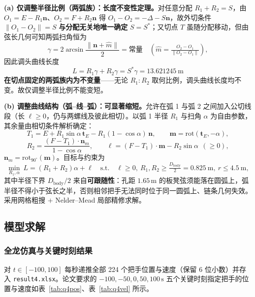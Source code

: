 ﻿\documentclass{cumcmthesis}
\begin{document}
\textbf{(a) 仅调整半径比例（两弧族）：长度不变性定理。}对任意分配 $R_1+R_2=S$，由 $O_1=E-R_1\mathbf{n}$、$O_2=F+R_2\mathbf{n}$ 得 $O_1-O_2=-\Delta-S\mathbf{n}$，故外切条件 $\|O_1-O_2\|=S$ \textbf{与分配无关地唯一确定} $S=S^*$；又切点 $T$ 虽随分配移动，但由弦长几何可知两弧扫角恒为
\begin{equation}
\gamma=2\arcsin\frac{\|\mathbf{n}+\hat{m}\|}{2}=\text{常量}\quad(\hat{m}=\tfrac{O_2-O_1}{\|O_2-O_1\|}),
\end{equation}
因此调头曲线长度
\begin{equation}
\boxed{\ L=R_1\gamma+R_2\gamma=S^{*}\gamma=13.621245\ \text{m}\ }
\end{equation}
\textbf{在切点固定的两弧族内为不变量}——无论 $R_1:R_2$ 取何比例，调头曲线长度均不变。故仅调整半径比例不能变短。

\textbf{(b) 调整曲线结构（弧–线–弧）：可显著缩短。}允许在弧 1 与弧 2 之间加入公切线段（长 $\ell\ge0$，仍与两螺线及彼此相切）。以弧 1 半径 $R_1$ 与扫角 $\alpha$ 为自由参数，其余量由相切条件解析确定：
\begin{equation}
T_1=E+R_1\sin\alpha\,\mathbf{t}_E-R_1(1-\cos\alpha)\,\mathbf{n},\qquad \mathbf{m}=\mathrm{rot}(\mathbf{t}_E,-\alpha),
\end{equation}
\begin{equation}
R_2=\frac{(F-T_1)\cdot\mathbf{n}_m}{1-\cos\alpha},\qquad \ell=(F-T_1)\cdot\mathbf{m}-R_2\sin\alpha\ \ (\ge0),
\end{equation}
$\mathbf{n}_m=\mathrm{rot}_{90^\circ}(\mathbf{m})$。目标与约束为
\begin{equation}
\min_{R_1,\alpha}\ L=(R_1+R_2)\alpha+\ell
\quad\text{s.t.}\quad \ell\ge0,\ R_1,R_2\ge\tfrac{D_{\text{body}}}{2}=0.825\ \text{m},\ r\le4.5\ \text{m},
\end{equation}
其中半径下界 $D_{\text{body}}/2$ 来自\textbf{可跟随性}：孔距 $1.65\,\text{m}$ 的板凳弦须能落在圆弧上，弧半径不得小于弦长之半，否则相邻把手无法同时位于同一圆弧上、链条几何失效。采用网格粗搜 $+$ Nelder–Mead 局部精修求解。

\subsection{模型求解}

\subsubsection{全龙仿真与关键时刻结果}
对 $t\in[-100,100]$ 每秒递推全部 224 个把手位置与速度（保留 6 位小数）并存入 \texttt{result4.xlsx}。论文要求的 $-100,-50,0,50,100\,\text{s}$ 五个关键时刻指定把手的位置与速度如表~\ref{tab:q4pos}、表~\ref{tab:q4vel} 所示。
\end{document}

